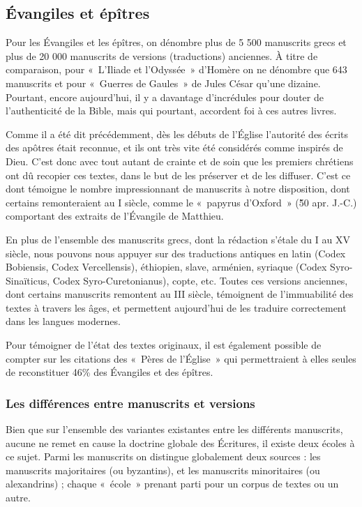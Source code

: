 \begin{small}
\subsection*{Évangiles et épîtres}

Pour les Évangiles et les épîtres, on dénombre plus de 5 500 manuscrits grecs et plus de 20 000 manuscrits de versions (traductions) anciennes. À titre de comparaison, pour «~L'Iliade et l'Odyssée~» d'Homère on ne dénombre que 643 manuscrits et pour «~Guerres de Gaules~» de Jules César qu'une dizaine. Pourtant, encore aujourd'hui, il y a davantage d'incrédules pour douter de l'authenticité de la Bible, mais qui pourtant, accordent foi à ces autres livres.\bigskip

Comme il a été dit précédemment, dès les débuts de l'Église l'autorité des écrits des apôtres était reconnue, et ils ont très vite été considérés comme inspirés de Dieu. C'est donc avec tout autant de crainte et de soin que les premiers chrétiens ont dû recopier ces textes, dans le but de les préserver et de les diffuser. C'est ce dont témoigne le nombre impressionnant de manuscrits à notre disposition, dont certains remonteraient au I siècle, comme le «~papyrus d'Oxford~» (\~50 apr. J.-C.) comportant des extraits de l'Évangile de Matthieu.\bigskip

En plus de l'ensemble des manuscrits grecs, dont la rédaction s'étale du I au XV siècle, nous pouvons nous appuyer sur des traductions antiques en latin (Codex Bobiensis, Codex Vercellensis), éthiopien, slave, arménien, syriaque (Codex Syro-Sinaïticus, Codex Syro-Curetonianus), copte, etc. Toutes ces versions anciennes, dont certains manuscrits remontent au III siècle, témoignent de l'immuabilité des textes à travers les âges, et permettent aujourd'hui de les traduire correctement dans les langues modernes.\bigskip

Pour témoigner de l'état des textes originaux, il est également possible de compter sur les citations des «~Pères de l'Église~» qui permettraient à elles seules de reconstituer 46\% des Évangiles et des épîtres.

\subsubsection*{Les différences entre manuscrits et versions}

Bien que sur l'ensemble des variantes existantes entre les différents manuscrits, aucune ne remet en cause la doctrine globale des Écritures, il existe deux écoles à ce sujet. Parmi les manuscrits on distingue globalement deux sources : les manuscrits majoritaires (ou byzantins), et les manuscrits minoritaires (ou alexandrins) ; chaque «~école~» prenant parti pour un corpus de textes ou un autre.\bigskip


\end{small}
